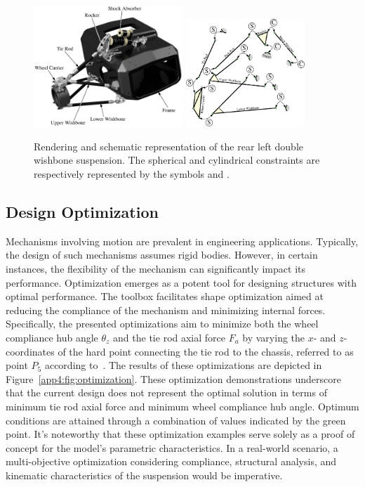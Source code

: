 \begin{figure}[htb]
  \centering
  \includegraphics[width=0.5\textwidth, trim={2cm 2cm 2.5cm 2cm}, clip]{./figures/appendix_4/rendering.eps}
  \includegraphics[width=0.4\textwidth]{./figures/appendix_4/constraints.eps}
  \caption{Rendering and schematic representation of the rear left double wishbone suspension. The spherical and cylindrical constraints are respectively represented by the symbols  and .}
  \label{app4:fig:suspension}
\end{figure}

\subsection{Design Optimization}

Mechanisms involving motion are prevalent in engineering applications. Typically, the design of such mechanisms assumes rigid bodies. However, in certain instances, the flexibility of the mechanism can significantly impact its performance. Optimization emerges as a potent tool for designing structures with optimal performance. The \TrussMe{} toolbox facilitates shape optimization aimed at reducing the compliance of the mechanism and minimizing internal forces. Specifically, the presented optimizations aim to minimize both the wheel compliance hub angle $\theta_z$ and the tie rod axial force $F_a$ by varying the $x$- and $z$- coordinates of the hard point connecting the tie rod to the chassis, referred to as point $P_5$ according to~\cite{larcher2024symbolic}. The results of these optimizations are depicted in Figure~\ref{app4:fig:optimization}. These optimization demonstrations underscore that the current design does not represent the optimal solution in terms of minimum tie rod axial force and minimum wheel compliance hub angle. Optimum conditions are attained through a combination of values indicated by the green point. It's noteworthy that these optimization examples serve solely as a proof of concept for the model's parametric characteristics. In a real-world scenario, a multi-objective optimization considering compliance, structural analysis, and kinematic characteristics of the suspension would be imperative.

